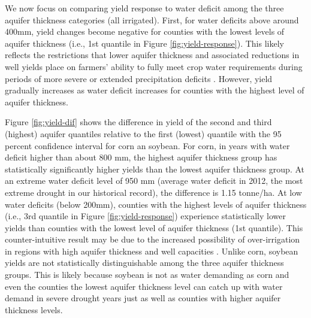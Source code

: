 \documentclass[
]{article}
\begin{document}
We now focus on comparing yield response to water deficit among the three aquifer thickness categories (all irrigated). First, for water deficits above around 400mm, yield changes become negative for counties with the lowest levels of aquifer thickness (i.e., 1st quantile in Figure \ref{fig:yield-response}). This likely reflects the restrictions that lower aquifer thickness and associated reductions in well yields place on farmers' ability to fully meet crop water requirements during periods of more severe or extended precipitation deficits \citetext{\citealp[\citet{foster2014modeling}]{rad2020effects}; \citealp{hrozencik2017heterogeneous}}. However, yield gradually increases as water deficit increases for counties with the highest level of aquifer thickness.

Figure \ref{fig:yield-dif} shows the difference in yield of the second and third (highest) aquifer quantiles relative to the first (lowest) quantile with the 95 percent confidence interval for corn an soybean. For corn, in years with water deficit higher than about 800 mm, the highest aquifer thickness group has statistically significantly higher yields than the lowest aquifer thickness group. At an extreme water deficit level of 950 mm (average water deficit in 2012, the most extreme drought in our historical record), the difference is 1.15 tonne/ha. At low water deficits (below 200mm), counties with the highest levels of aquifer thickness (i.e., 3rd quantile in Figure \ref{fig:yield-response}) experience statistically lower yields than counties with the lowest level of aquifer thickness (1st quantile). This counter-intuitive result may be due to the increased possibility of over-irrigation in regions with high aquifer thickness and well capacities \citep{foster2019assessing, gibson2017case, gibson2019benchmarking}. Unlike corn, soybean yields are not statistically distinguishable among the three aquifer thickness groups. This is likely because soybean is not as water demanding as corn and even the counties the lowest aquifer thickness level can catch up with water demand in severe drought years just as well as counties with higher aquifer thickness levels.
\end{document}
